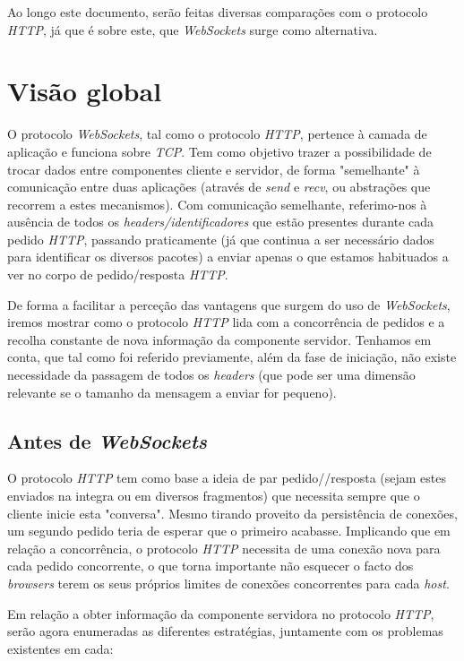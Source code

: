 \documentclass[a4paper]{article}
\begin{document}
Ao longo este documento, serão feitas diversas comparações com o protocolo \emph{HTTP}, já que é sobre este, que \emph{WebSockets} surge como alternativa.

\section{Visão global}

O protocolo \emph{WebSockets}, tal como o protocolo \emph{HTTP}, pertence à camada de aplicação e funciona sobre \emph{TCP}. Tem como objetivo trazer a possibilidade de trocar dados entre componentes cliente e servidor, de forma "semelhante" à comunicação entre duas aplicações (através de \emph{send} e \emph{recv}, ou abstrações que recorrem a estes mecanismos). Com comunicação semelhante, referimo-nos à ausência de todos os \emph{headers/identificadores} que estão presentes durante cada pedido \emph{HTTP}, passando praticamente (já que continua a ser necessário dados para identificar os diversos pacotes) a enviar apenas o que estamos habituados a ver no corpo de pedido/resposta \emph{HTTP}.

De forma a facilitar a perceção das vantagens que surgem do uso de \emph{WebSockets}, iremos mostrar como o protocolo \emph{HTTP} lida com a  concorrência de pedidos e a recolha constante de nova informação da componente servidor. Tenhamos em conta, que tal como foi referido previamente, além da fase de iniciação, não existe necessidade da passagem de todos os \emph{headers} (que pode ser uma dimensão relevante se o tamanho da mensagem a enviar for pequeno).

\subsection{Antes de \emph{WebSockets}}

O protocolo \emph{HTTP} tem como base a ideia de par pedido//resposta (sejam estes enviados na integra ou em diversos fragmentos) que necessita sempre que o cliente inicie esta "conversa". Mesmo tirando proveito da persistência de conexões, um segundo pedido teria de esperar que o primeiro acabasse. Implicando que em relação a concorrência, o protocolo \emph{HTTP} necessita de uma conexão nova para cada pedido concorrente, o que torna importante não esquecer o facto dos \emph{browsers} terem os seus próprios limites de conexões concorrentes para cada \emph{host}.

Em relação a obter informação da componente servidora no protocolo \emph{HTTP}, serão agora enumeradas as diferentes estratégias,  juntamente com os problemas existentes em cada:
\end{document}
